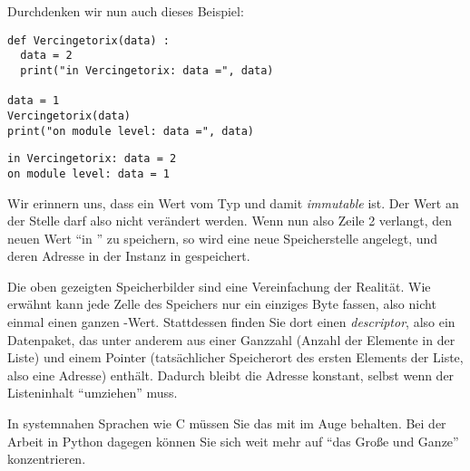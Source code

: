 \begin{tcolorbox}[title=Speicherbild]
\begin{center}
\end{center}
\end{tcolorbox}


Durchdenken wir nun auch dieses Beispiel:
\begin{codebox}
\begin{verbatim}
def Vercingetorix(data) :
  data = 2
  print("in Vercingetorix: data =", data)

data = 1
Vercingetorix(data)
print("on module level: data =", data)
\end{verbatim}
\end{codebox}

\begin{cmdbox}
\begin{verbatim}
in Vercingetorix: data = 2
on module level: data = 1
\end{verbatim}
\end{cmdbox}

Wir erinnern uns, dass  ein Wert vom Typ  und damit \emph{immutable} ist. Der Wert an der Stelle  darf also nicht verändert werden. Wenn nun also Zeile 2 verlangt, den neuen Wert  \enquote{in } zu speichern, so wird eine neue Speicherstelle angelegt, und deren Adresse in der Instanz  in  gespeichert.

\begin{hintbox}
Die oben gezeigten Speicherbilder sind eine Vereinfachung der Realität. Wie erwähnt kann jede Zelle des Speichers nur ein einziges Byte fassen, also nicht einmal einen ganzen -Wert. Stattdessen finden Sie dort einen \emph{descriptor}, also ein Datenpaket, das unter anderem aus einer Ganzzahl (Anzahl der Elemente in der Liste) und einem Pointer (tatsächlicher Speicherort des ersten Elements der Liste, also eine Adresse) enthält. Dadurch bleibt die Adresse  konstant, selbst wenn der Listeninhalt \enquote{umziehen} muss.

In systemnahen Sprachen wie C müssen Sie das mit im Auge behalten. Bei der Arbeit in Python dagegen können Sie sich weit mehr auf \enquote{das Große und Ganze} konzentrieren.
\end{hintbox}

